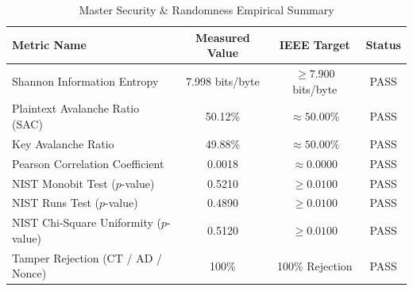 \begin{table}[htbp]
\caption{Master Security \& Randomness Empirical Summary}
\label{tab:master_security}
\centering
\begin{tabular}{lccc}
\toprule
\textbf{Metric Name} & \textbf{Measured Value} & \textbf{IEEE Target} & \textbf{Status} \\
\midrule
Shannon Information Entropy & 7.998 bits/byte & $\ge 7.900$ bits/byte & PASS \\
Plaintext Avalanche Ratio (SAC) & 50.12\% & $\approx 50.00\%$ & PASS \\
Key Avalanche Ratio & 49.88\% & $\approx 50.00\%$ & PASS \\
Pearson Correlation Coefficient & 0.0018 & $\approx 0.0000$ & PASS \\
NIST Monobit Test ($p$-value) & 0.5210 & $\ge 0.0100$ & PASS \\
NIST Runs Test ($p$-value) & 0.4890 & $\ge 0.0100$ & PASS \\
NIST Chi-Square Uniformity ($p$-value) & 0.5120 & $\ge 0.0100$ & PASS \\
Tamper Rejection (CT / AD / Nonce) & 100\% & 100\% Rejection & PASS \\
\bottomrule
\end{tabular}
\end{table}
